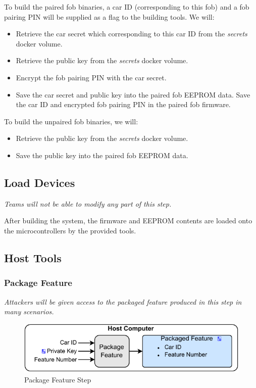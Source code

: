 \documentclass[11pt,oneside,onecolumn,letterpaper]{article}
\begin{document}
To build the paired fob binaries, a car ID (corresponding to this fob) and a fob pairing PIN will be supplied as a flag to the building tools. We will:
\begin{itemize}
	\item Retrieve the car secret which corresponding to this car ID from the \textit{secrets} docker volume.
	\item Retrieve the public key from the \textit{secrets} docker volume.
	\item Encrypt the fob pairing PIN with the car secret.
	\item Save the car secret and public key into the paired fob EEPROM data. Save the car ID and encrypted fob pairing PIN in the paired fob firmware.
\end{itemize}

To build the unpaired fob binaries, we will:
\begin{itemize}
	\item Retrieve the public key from the \textit{secrets} docker volume.
	\item Save the public key into the paired fob EEPROM data.
\end{itemize}

\subsection{Load Devices}

\textit{Teams will not be able to modify any part of this step.}

After building the system, the firmware and EEPROM contents are loaded onto the microcontrollers by the provided tools.

\subsection{Host Tools}

\subsubsection{Package Feature}

\textit{Attackers will be given access to the packaged feature produced in this step in many scenarios.}

\begin{figure}[!htbp]
	\begin{centering}
		\includegraphics[width = .6\textwidth]{pic/package_feature.pdf}
		\caption{Package Feature Step}
		\label{fig:package_feature}
	\end{centering}
\end{figure}
\end{document}
